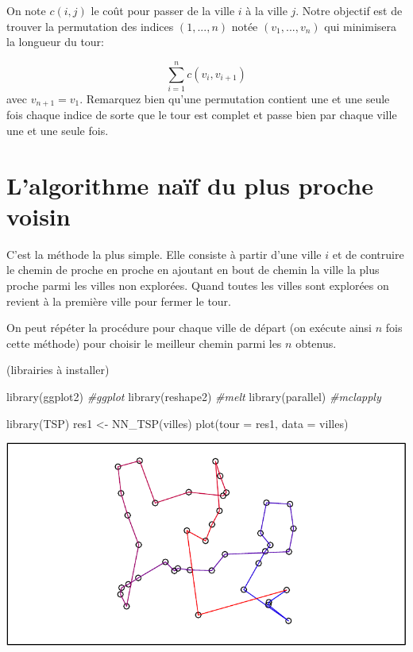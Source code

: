 \documentclass[
]{article}
\newenvironment{Shaded}{\begin{snugshade}}{\end{snugshade}}
\newcommand{\AttributeTok}[1]{\textcolor[rgb]{0.77,0.63,0.00}{#1}}
\newcommand{\CommentTok}[1]{\textcolor[rgb]{0.56,0.35,0.01}{\textit{#1}}}
\newcommand{\FunctionTok}[1]{\textcolor[rgb]{0.00,0.00,0.00}{#1}}
\newcommand{\NormalTok}[1]{#1}
\newcommand{\OtherTok}[1]{\textcolor[rgb]{0.56,0.35,0.01}{#1}}
\begin{document}
On note \(c(i,j)\) le coût pour passer de la ville \(i\) à la ville
\(j\). Notre objectif est de trouver la permutation des indices
\((1,...,n)\) notée \((v_1,...,v_n)\) qui minimisera la longueur du
tour:

\[\sum_{i=1}^{n}c(v_i,v_{i+1})\] avec \(v_{n+1} = v_1\). Remarquez bien
qu'une permutation contient une et une seule fois chaque indice de sorte
que le tour est complet et passe bien par chaque ville une et une seule
fois.

\hypertarget{lalgorithme-nauxeff-du-plus-proche-voisin}{%
\section{L'algorithme naïf du plus proche
voisin}\label{lalgorithme-nauxeff-du-plus-proche-voisin}}

C'est la méthode la plus simple. Elle consiste à partir d'une ville
\(i\) et de contruire le chemin de proche en proche en ajoutant en bout
de chemin la ville la plus proche parmi les villes non explorées. Quand
toutes les villes sont explorées on revient à la première ville pour
fermer le tour.

On peut répéter la procédure pour chaque ville de départ (on exécute
ainsi \(n\) fois cette méthode) pour choisir le meilleur chemin parmi
les \(n\) obtenus.

(librairies à installer)

\begin{Shaded}
\begin{Highlighting}[]
\FunctionTok{library}\NormalTok{(ggplot2) }\CommentTok{\#ggplot}
\FunctionTok{library}\NormalTok{(reshape2) }\CommentTok{\#melt}
\FunctionTok{library}\NormalTok{(parallel) }\CommentTok{\#mclapply}
\end{Highlighting}
\end{Shaded}

\begin{Shaded}
\begin{Highlighting}[]
\FunctionTok{library}\NormalTok{(TSP)}
\NormalTok{res1 }\OtherTok{\textless{}{-}} \FunctionTok{NN\_TSP}\NormalTok{(villes)}
\FunctionTok{plot}\NormalTok{(}\AttributeTok{tour =}\NormalTok{ res1, }\AttributeTok{data =}\NormalTok{ villes)}
\end{Highlighting}
\end{Shaded}

\includegraphics{rapport_TSP_files/figure-latex/unnamed-chunk-4-1.pdf}
\end{document}

